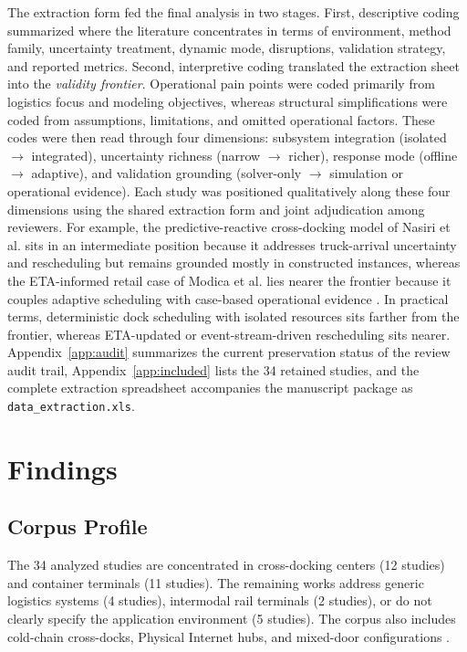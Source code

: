 \documentclass[preprint,12pt,number,longtitle]{elsarticle}
\begin{document}
The extraction form fed the final analysis in two stages. First, descriptive coding summarized where the literature concentrates in terms of environment, method family, uncertainty treatment, dynamic mode, disruptions, validation strategy, and reported metrics. Second, interpretive coding translated the extraction sheet into the \textit{validity frontier}. Operational pain points were coded primarily from logistics focus and modeling objectives, whereas structural simplifications were coded from assumptions, limitations, and omitted operational factors. These codes were then read through four dimensions: subsystem integration (isolated $\rightarrow$ integrated), uncertainty richness (narrow $\rightarrow$ richer), response mode (offline $\rightarrow$ adaptive), and validation grounding (solver-only $\rightarrow$ simulation or operational evidence). Each study was positioned qualitatively along these four dimensions using the shared extraction form and joint adjudication among reviewers. For example, the predictive-reactive cross-docking model of Nasiri et al. sits in an intermediate position because it addresses truck-arrival uncertainty and rescheduling but remains grounded mostly in constructed instances, whereas the ETA-informed retail case of Modica et al. lies nearer the frontier because it couples adaptive scheduling with case-based operational evidence \cite{nasiri2022,modica2024}. In practical terms, deterministic dock scheduling with isolated resources sits farther from the frontier, whereas ETA-updated or event-stream-driven rescheduling sits nearer. Appendix~\ref{app:audit} summarizes the current preservation status of the review audit trail, Appendix~\ref{app:included} lists the 34 retained studies, and the complete extraction spreadsheet accompanies the manuscript package as \texttt{data\_extraction.xls}.

\section{Findings}

\subsection{Corpus Profile}

The 34 analyzed studies are concentrated in cross-docking centers (12 studies) and container terminals (11 studies). The remaining works address generic logistics systems (4 studies), intermodal rail terminals (2 studies), or do not clearly specify the application environment (5 studies). The corpus also includes cold-chain cross-docks, Physical Internet hubs, and mixed-door configurations \cite{zheng2026,essghaier2023,eti2025}.
\end{document}
